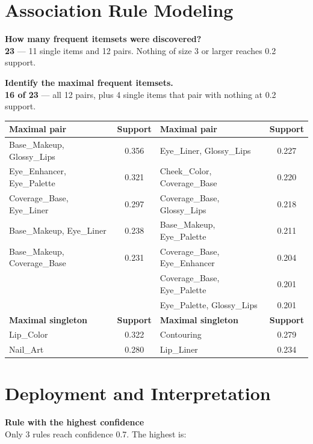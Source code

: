 \documentclass[11pt,a4paper]{article}
\begin{document}
\section{Association Rule Modeling}

\textbf{How many frequent itemsets were discovered?}\\
\textbf{23} — 11 single items and 12 pairs. Nothing of size 3 or larger reaches 0.2 support.

\textbf{Identify the maximal frequent itemsets.}\\
\textbf{16 of 23} — all 12 pairs, plus 4 single items that pair with nothing at 0.2 support.

\begin{center}\small
\begin{tabular}{lc@{\hspace{1.1cm}}lc}
\toprule
\textbf{Maximal pair} & \textbf{Support} & \textbf{Maximal pair} & \textbf{Support} \\
\midrule
Base\_Makeup, Glossy\_Lips    & 0.356 & Eye\_Liner, Glossy\_Lips      & 0.227 \\
Eye\_Enhancer, Eye\_Palette   & 0.321 & Cheek\_Color, Coverage\_Base  & 0.220 \\
Coverage\_Base, Eye\_Liner    & 0.297 & Coverage\_Base, Glossy\_Lips  & 0.218 \\
Base\_Makeup, Eye\_Liner      & 0.238 & Base\_Makeup, Eye\_Palette    & 0.211 \\
Base\_Makeup, Coverage\_Base  & 0.231 & Coverage\_Base, Eye\_Enhancer & 0.204 \\
                              &       & Coverage\_Base, Eye\_Palette  & 0.201 \\
                              &       & Eye\_Palette, Glossy\_Lips    & 0.201 \\
\midrule
\textbf{Maximal singleton} & \textbf{Support} & \textbf{Maximal singleton} & \textbf{Support} \\
\midrule
Lip\_Color  & 0.322 & Contouring & 0.279 \\
Nail\_Art   & 0.280 & Lip\_Liner  & 0.234 \\
\bottomrule
\end{tabular}
\end{center}

\section{Deployment and Interpretation}

\textbf{Rule with the highest confidence}\\
Only 3 rules reach confidence 0.7. The highest is:
\end{document}
